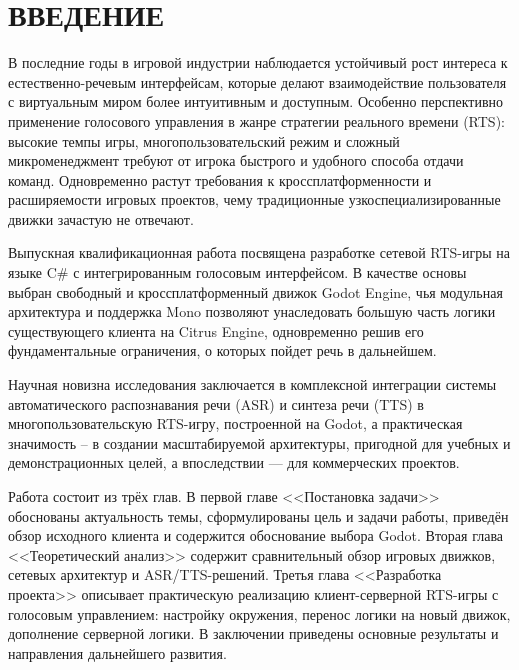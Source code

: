 \section*{ВВЕДЕНИЕ}
    В последние годы в игровой индустрии наблюдается устойчивый рост интереса к естественно-речевым интерфейсам, которые делают взаимодействие пользователя с виртуальным миром более интуитивным и доступным. Особенно перспективно применение голосового управления в жанре стратегии реального времени (RTS): высокие темпы игры, многопользовательский режим и сложный микроменеджмент требуют от игрока быстрого и удобного способа отдачи команд. Одновременно растут требования к кроссплатформенности и расширяемости игровых проектов, чему традиционные узкоспециализированные движки зачастую не отвечают.

    Выпускная квалификационная работа посвящена разработке сетевой RTS-игры на языке C\# с интегрированным голосовым интерфейсом. В качестве основы выбран свободный и кроссплатформенный движок Godot Engine, чья модульная архитектура и поддержка Mono позволяют унаследовать большую часть логики существующего клиента на Citrus Engine, одновременно решив его фундаментальные ограничения, о которых пойдет речь в дальнейшем.

    Научная новизна исследования заключается в комплексной интеграции системы автоматического распознавания речи (ASR) и синтеза речи (TTS) в многопользовательскую RTS-игру, построенной на Godot, а практическая значимость -- в создании масштабируемой архитектуры, пригодной для учебных и демонстрационных целей, а впоследствии — для коммерческих проектов.

    Работа состоит из трёх глав. В первой главе <<Постановка задачи>> обоснованы актуальность темы, сформулированы цель и задачи работы, приведён обзор исходного клиента и содержится обоснование выбора Godot. Вторая глава <<Теоретический анализ>> содержит сравнительный обзор игровых движков, сетевых архитектур и ASR/TTS-решений. Третья глава <<Разработка проекта>> описывает практическую реализацию клиент-серверной RTS-игры с голосовым управлением: настройку окружения, перенос логики на новый движок, дополнение серверной логики. В заключении приведены основные результаты и направления дальнейшего развития.